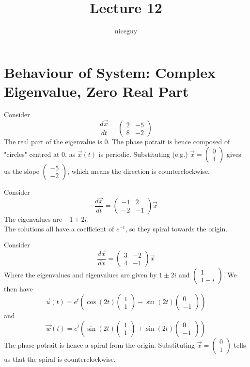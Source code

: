 \documentclass[12pt]{article}
\title{Lecture 12}
\author{niceguy}
\begin{document}
\maketitle

\section{Behaviour of System: Complex Eigenvalue, Zero Real Part}
Consider
$$\frac{d\vec{x}}{dt} = \begin{pmatrix} 2 & -5 \\ 8 & -2 \end{pmatrix}$$
The real part of the eigenvalue is 0. The phase potrait is hence composed of "circles" centred at 0, as $\vec{x}(t)$ is periodic. Substituting (e.g.) $\vec{x} = \begin{pmatrix} 0 \\ 1 \end{pmatrix}$ gives us the slope $\begin{pmatrix} -5 \\ -2 \end{pmatrix}$, which means the direction is counterclockwise.

\begin{ex}
	Consider
	$$\frac{d\vec{x}}{dt} = \begin{pmatrix} -1 & 2 \\ -2 & -1 \end{pmatrix} \vec{x}$$
	The eigenvalues are $-1 \pm 2i$. \\
	The solutions all have a coefficient of $e^{-t}$, so they spiral towards the origin.
\end{ex}

\begin{ex}
	Consider
	$$\frac{d\vec{x}}{dx} = \begin{pmatrix} 3 & -2 \\ 4 & -1 \end{pmatrix}\vec{x}$$
	Where the eigenvalues and eigenvalues are given by $1 \pm 2i$ and $\begin{pmatrix} 1 \\ 1-i \end{pmatrix}$. We then have
	$$\vec{u}(t) = e^t\left(\cos(2t)\begin{pmatrix} 1 \\ 1\end{pmatrix} - \sin(2t)\begin{pmatrix} 0 \\ -1\end{pmatrix}\right)$$
	and
	$$\vec{w}(t) = e^t\left(\sin(2t)\begin{pmatrix} 1 \\ 1 \end{pmatrix} + \sin(2t) \begin{pmatrix} 0 \\ -1 \end{pmatrix}\right)$$
	The phase potrait is hence a spiral from the origin. Substituting $\vec{x} = \begin{pmatrix} 0 \\ 1 \end{pmatrix}$ tells us that the spiral is counterclockwise.
\end{ex}
\end{document}
